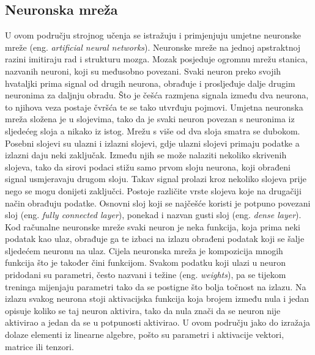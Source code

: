 \subsection{Neuronska mreža}
U ovom području strojnog učenja se istražuju i primjenjuju umjetne neuronske mreže (eng. \textit{artificial neural networks}). Neuronske mreže na jednoj apstraktnoj razini imitiraju rad i strukturu mozga. Mozak posjeduje ogromnu mrežu stanica, nazvanih neuroni, koji su međusobno povezani. Svaki neuron preko svojih hvataljki prima signal od drugih neurona, obrađuje i prosljeđuje dalje drugim neuronima za daljnju obradu. Što je češća razmjena signala između dva neurona, to njihova veza postaje čvršća te se tako utvrđuju pojmovi. Umjetna neuronska mreža složena je u slojevima, tako da je svaki neuron povezan s neuronima iz sljedećeg sloja a nikako iz istog. Mrežu s više od dva sloja smatra se dubokom. Posebni slojevi su ulazni i izlazni slojevi, gdje ulazni slojevi primaju podatke a izlazni daju neki zaključak. Između njih se može nalaziti nekoliko skrivenih slojeva, tako da sirovi podaci stižu samo prvom sloju neurona, koji obrađeni signal usmjeravaju drugom sloju. Takav signal prolazi kroz nekoliko slojeva prije nego se mogu donijeti zaključci. Postoje različite vrste slojeva koje na drugačiji način obrađuju podatke. Osnovni sloj koji se najčešće koristi je potpuno povezani sloj (eng. \textit{fully connected layer}), ponekad i nazvan gusti sloj (eng. \textit{dense layer}). Kod računalne neuronske mreže svaki neuron je neka funkcija, koja prima neki podatak kao ulaz, obrađuje ga te izbaci na izlazu obrađeni podatak koji se šalje sljedećem neuronu na ulaz. Cijela neuronska mreža je kompozicija mnogih funkcija što je također čini funkcijom. Svakom podatku koji ulazi u neuron pridodani su parametri, često nazvani i težine (eng. \textit{weights}), pa se tijekom treninga mijenjaju parametri tako da se postigne što bolja točnost na izlazu. Na izlazu svakog neurona stoji aktivacijska funkcija koja brojem između nula i jedan opisuje koliko se taj neuron aktivira, tako da nula znači da se neuron nije aktivirao a jedan da se u potpunosti aktivirao. U ovom području jako do izražaja dolaze elementi iz linearne algebre, pošto su parametri i aktivacije vektori, matrice ili tenzori. 

